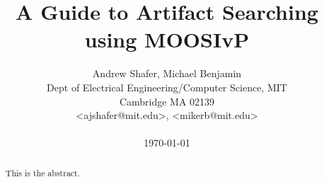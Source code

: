 \documentclass[conference]{IEEEtran}
\begin{document}
\newlength{\pin}
\setlength{\pin}{0.2in}
\newcommand{\email}[1]{\textless #1\textgreater}
\newcommand{\img}[4][width=\linewidth]
{
\begin{figure}[ht]
\centering
\texttt{[image: \#2]}
\caption{#3}
\label{#4}
\end{figure}
}
\newcommand{\bhvsg}{bhv\_SearchGrid}

\newenvironment{hangpar}[1]{\list{}{
    \setlength{\listparindent}{1.5em}       \setlength{\itemindent}{0pt}
    \setlength{\itemsep}{0pt}               \setlength{\parindent}{0pt}
    \setlength{\rightmargin}{0pt}           \setlength{\leftmargin}{#1}
               \parsep                                 \medskipamount}%
    \item\hspace{-\leftmargin}\noindent\ignorespaces}
    {\endlist}


\title{A Guide to Artifact Searching using MOOSIvP}


\author{Andrew Shafer, Michael Benjamin \\
Dept of Electrical Engineering/Computer Science, MIT \\
Cambridge MA 02139 \\
\email{ajshafer@mit.edu}, \email{mikerb@mit.edu} \\ \\
{\Large{\today}}}
\maketitle



\begin{abstract}
This is the abstract.
\end{abstract}











\small
 


\newpage
\appendix

%
%
\end{document}
